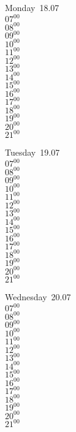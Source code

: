 \documentclass[11pt,a4paper]{book}\usepackage[]{graphicx}\usepackage[]{color}
\begin{document}
\begin{headerbox}
\end{headerbox}
\begin{weekdaybox}
  Monday~18.07\\
  { 
  \vfill
  $07^{00}$\\
$08^{00}$\\
$09^{00}$\\
$10^{00}$\\
$11^{00}$\\
$12^{00}$\\
$13^{00}$\\
$14^{00}$\\
$15^{00}$\\
$16^{00}$\\
$17^{00}$\\
$18^{00}$\\
$19^{00}$\\
$20^{00}$\\
$21^{00}$\\
  }
\end{weekdaybox}
\begin{weekdaybox}
  Tuesday~19.07\\
  { 
  \vfill
  $07^{00}$\\
$08^{00}$\\
$09^{00}$\\
$10^{00}$\\
$11^{00}$\\
$12^{00}$\\
$13^{00}$\\
$14^{00}$\\
$15^{00}$\\
$16^{00}$\\
$17^{00}$\\
$18^{00}$\\
$19^{00}$\\
$20^{00}$\\
$21^{00}$\\
  }
\end{weekdaybox}
\begin{weekdaybox}
  Wednesday~20.07\\
  { 
  \vfill
  $07^{00}$\\
$08^{00}$\\
$09^{00}$\\
$10^{00}$\\
$11^{00}$\\
$12^{00}$\\
$13^{00}$\\
$14^{00}$\\
$15^{00}$\\
$16^{00}$\\
$17^{00}$\\
$18^{00}$\\
$19^{00}$\\
$20^{00}$\\
$21^{00}$\\
  }
\end{weekdaybox}
\end{document}
